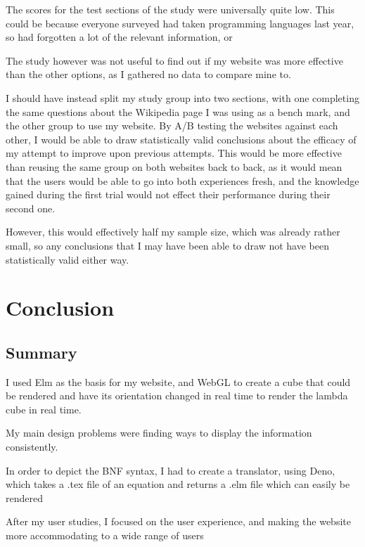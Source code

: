 \documentclass{l4proj}
\begin{document}
The scores for the test sections of the study were universally quite low.  This could be because everyone surveyed had taken programming languages last year, so had forgotten a lot of the relevant information, or 

The study however was not useful to find out if my website was more effective than the other options, as I gathered no data to compare mine to.

I should have instead split my study group into two sections, with one completing the same questions about the Wikipedia page I was using as a bench mark, and the other group to use my website.  By A/B testing the websites against each other, I would be able to draw statistically valid conclusions about the efficacy of my attempt to improve upon previous attempts.  This would be more effective than reusing the same group on both websites back to back, as it would mean that the users would be able to go into both experiences fresh, and the knowledge gained during the first trial would not effect their performance during their second one. 

However, this would effectively half my sample size, which was already rather small, so any conclusions that I may have been able to draw not have been statistically valid either way.

\chapter{Conclusion}    

\section{Summary}

I used Elm as the basis for my website, and WebGL to create a cube that could be rendered and have its orientation changed in real time to render the lambda cube in real time.

My main design problems were finding ways to display the information consistently.

In order to depict the BNF syntax, I had to create a translator, using Deno, which takes a .tex file of an equation and returns a .elm file which can easily be rendered

After my user studies, I focused on the user experience, and making the website more accommodating to a wide range of users
\end{document}

